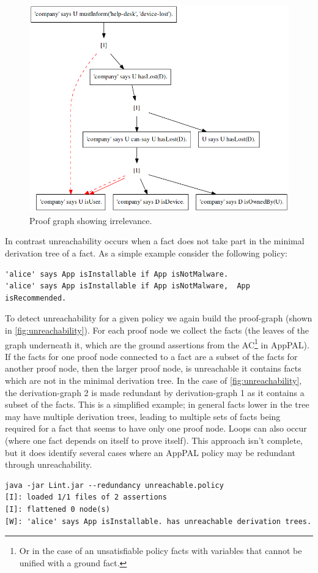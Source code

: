 \documentclass[thesis.tex]{subfiles}
\begin{document}
\begin{figure}
  \centering
  \includegraphics[width=0.5\linewidth]{./figures/irrelevance.png}
  \caption{Proof graph showing irrelevance.}
  \label{fig:irrelevance}
\end{figure}

In contrast unreachability occurs when a fact does not take part in the minimal
derivation tree of a fact.  As a simple example consider the following policy:

\begin{lstlisting}
'alice' says App isInstallable if App isNotMalware.
'alice' says App isInstallable if App isNotMalware,  App isRecommended.
\end{lstlisting}

To detect unreachability for a given policy we again build the proof-graph (shown
in \autoref{fig:unreachability}).  For each proof node we collect the facts
(the leaves of the graph underneath it, which are the ground assertions from the
AC\footnote{Or in the case of an unsatisfiable policy facts with variables that
  cannot be unified with a ground fact.} in
AppPAL).  If the facts for one proof node connected to a fact are a subset of
the facts for another proof node, then the larger proof node, is unreachable it
contains facts which are not in the minimal derivation tree.   In the case of
\autoref{fig:unreachability}, the derivation-graph 2 is made redundant by
derivation-graph 1 as it contains a subset of the facts.  This is a
simplified example; in general facts lower in the tree may have multiple
derivation trees, leading to multiple sets of facts being required for a fact
that seems to have only one proof node.  Loops can also occur (where one fact
depends on itself to prove itself).  This approach isn't complete, but it does
identify several cases where an AppPAL policy may be redundant through
unreachability.

\begin{lstlisting}[float, caption={Output of AppPAL when checking a policy with unreachability.}]
java -jar Lint.jar --redundancy unreachable.policy
[I]: loaded 1/1 files of 2 assertions
[I]: flattened 0 node(s)
[W]: 'alice' says App isInstallable. has unreachable derivation trees.
\end{lstlisting}
\end{document}
